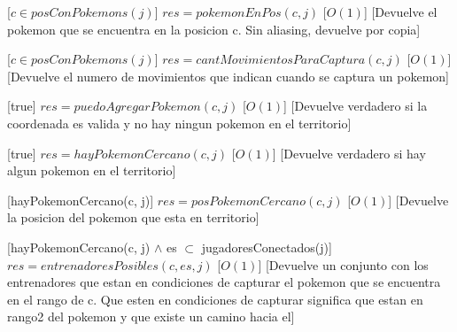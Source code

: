 \begin{Interfaz}
%
[$c \in posConPokemons(j)$]
{$res = pokemonEnPos(c, j)$}%
[$O(1)$] %
[Devuelve el pokemon que se encuentra en la posicion c. Sin aliasing, devuelve por copia]


%
[$c \in posConPokemons(j)$] %
{$res = cantMovimientosParaCaptura(c, j)$}%
[$O(1)$] %
[Devuelve el numero de movimientos que indican cuando se captura un pokemon]



%
[true] 
{$res = puedoAgregarPokemon(c, j)$}  %
[$O(1)$] 
[Devuelve verdadero si la coordenada es valida y no hay ningun pokemon en el territorio]


%
[true] 
{$res = hayPokemonCercano(c, j)$}  %
[$O(1)$] 
[Devuelve verdadero si hay algun pokemon en el territorio]


%
[hayPokemonCercano(c, j)] 
{$res = posPokemonCercano(c, j)$}  %
[$O(1)$] 
[Devuelve la posicion del pokemon que esta en territorio]


%
[hayPokemonCercano(c, j) $\land$ es $\subset$ jugadoresConectados(j)] 
{$res = entrenadoresPosibles(c, es, j)$}  %
[$O(1)$] %
[Devuelve un conjunto con los entrenadores que estan en condiciones de capturar el pokemon que se encuentra en el rango de c. Que esten en condiciones de capturar significa que estan en rango2 del pokemon y que existe un camino hacia el]



\end{Interfaz}
